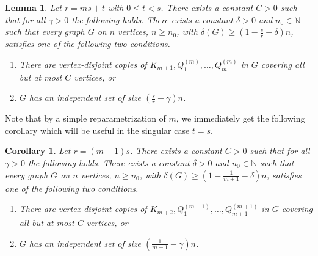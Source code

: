 \documentclass[reqno, 12pt]{amsart}
\numberwithin{equation}{section}
\numberwithin{figure}{section}
\theoremstyle{plain}
\newtheorem{cor}[thm]{Corollary}
\newtheorem{lemma}[thm]{Lemma}
\theoremstyle{definition}
\begin{document}
    \begin{lemma}\label{l:6.2chr}
    Let $r = ms+t$ with $0 \leq t <s$. There exists a constant $C>0$ such that for all $\gamma>0$ the following holds. There exists a constant $\delta >0$ and $n_0\in\mathbb{N}$ such that every graph $G$ on $n$ vertices, $n\geq n_0$, with $\delta(G)\geq \left(1-\frac{s}{r}-\delta\right)n$, satisfies one of the following two conditions.
    \begin{enumerate}[label=(\roman*)]
        \item There are vertex-disjoint copies of $K_{m+1},Q_1^{(m)},\dots, Q_m^{(m)}$ in $G$ covering all but at most $C$ vertices, or
        \label{l:6.2chr(i)}
        \item $G$ has an independent set of size $\left(\frac{s}{r}-\gamma\right)n$. \label{l:6.2chr(ii)}
        \end{enumerate}
    \end{lemma}

    Note that by a simple reparametrization of $m$, we immediately get the following corollary which will be useful in the singular case $t=s$.
    
    \begin{cor}\label{cor:6.2chr}
    Let $r = (m+1)s$. There exists a constant $C>0$ such that for all $\gamma>0$ the following holds. There exists a constant $\delta >0$ and $n_0\in\mathbb{N}$ such that every graph $G$ on $n$ vertices, $n\geq n_0$, with $\delta(G)\geq \left(1-\frac{1}{m+1}-\delta\right)n$, satisfies one of the following two conditions.
    
    \begin{enumerate}[label=(\roman*)]
        \item There are vertex-disjoint copies of $K_{m+2},Q_1^{(m+1)},\dots, Q_{m+1}^{(m+1)}$ in $G$ covering all but at most $C$ vertices, or
        \item $G$ has an independent set of size $\left(\frac{1}{m+1}-\gamma\right)n$.
        \end{enumerate}
    \end{cor}
    
\end{document}
